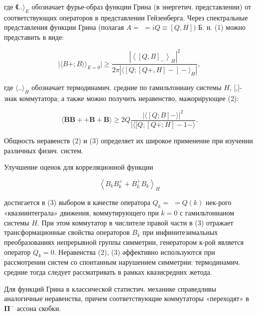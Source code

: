 \documentclass[10pt]{article}
\begin{document}
где $《 ..\rangle_{E}$ обозначает фурье-образ функции Грина (в энергетич. представлении) от соответствующих операторов в представлении Гейзенберга. Через спектральные представления функции Грина (полагая $A=$ $=i Q \equiv[Q, H])$ Б. н. (1) можно представить в виде:



\[

|\langle B+; B\rangle\rangle_{E=0} \mid \geqslant \frac{\left|\left\langle[Q, B]_{-}\right\rangle_{H}\right|^{2}}{2 \pi\left|\langle[Q ;[Q+, H]-]-\rangle_{H}\right|},

\]



где $\langle. .\rangle_{H}$ обозначает термодинамич. средние по гамильтониану системы $H$, [,]- знак коммутатора; а также можно получить неравенство, мажорирующее (2):



\[

\langle\boldsymbol{B} \boldsymbol{B}++\boldsymbol{B}+\boldsymbol{B}\rangle \geqslant 2 Q \frac{|\langle[Q ; B]-\rangle|^{2}}{\mid\langle[Q ;[Q+; H]-1-\rangle} .

\]



Общность неравенств (2) и (3) определяет их широкое применение при изучении различных физич. систем.



Улучшение оценок для корреляционной функции



\[

\left\langle B_{k} B_{k}^{+}+B_{k}^{+} B_{k}\right\rangle_{H}

\]



достигается в (3) выбором в качестве оператора $Q_{k}=$ $=Q(k)$ нек-рого «квазиинтеграла» движения, коммутирующего при $k=0$ с гамильтонианом системы $H$. При этом коммутатор в числителе правой части в (3) отражает трансформационные свойства операторов $B_{k}$ при инфинитезимальных преобразованиях непрерывной группы симметрии, генератором к-рой является оператор $Q_{k}=0$. Неравенства (2), (3) әффективно используются при рассмотрении систем со спонтанным нарушением симметрии: термодинамич. средние тогда следует рассматривать в рамках квазисредних жетода.



Для функций Грина в классической статистич. механике справедливы аналогичные неравенства, причем соответствующие коммутаторы «переходят» в $\boldsymbol{\Pi}^{-}$ ассона скобки.
\end{document}
